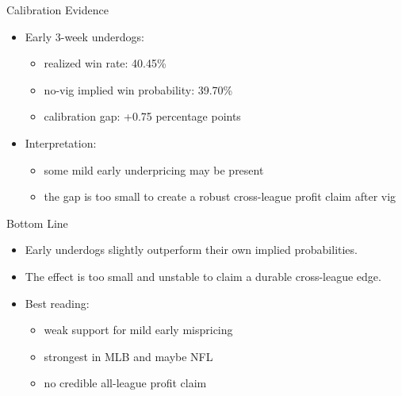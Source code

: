 \documentclass{beamer}
\begin{document}
\begin{frame}{Calibration Evidence}
\begin{itemize}
\item Early 3-week underdogs:
\begin{itemize}
\item realized win rate: 40.45\%
\item no-vig implied win probability: 39.70\%
\item calibration gap: +0.75 percentage points
\end{itemize}
\item Interpretation:
\begin{itemize}
\item some mild early underpricing may be present
\item the gap is too small to create a robust cross-league profit claim after vig
\end{itemize}
\end{itemize}
\end{frame}

\begin{frame}{Bottom Line}
\begin{itemize}
\item Early underdogs slightly outperform their own implied probabilities.
\item The effect is too small and unstable to claim a durable cross-league edge.
\item Best reading:
\begin{itemize}
\item weak support for mild early mispricing
\item strongest in MLB and maybe NFL
\item no credible all-league profit claim
\end{itemize}
\end{itemize}
\end{frame}
\end{document}
